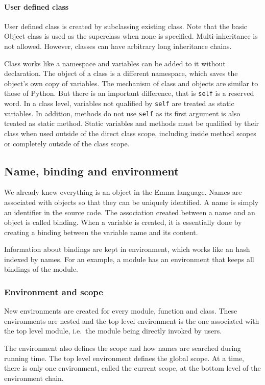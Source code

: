 \documentclass[10pt,a4paper]{article}
\begin{document}
\paragraph{User defined class}
User defined class is created by subclassing existing class. 
Note that the basic Object class is used as the superclass when none is 
specified. 
Multi-inheritance is not allowed.
However, classes can have arbitrary long inheritance chains.

Class works like a namespace and variables can be added to it without
declaration. 
The object of a class is a different namespace, which saves the object's
own copy of variables.
The mechanism of class and objects are similar to those of Python.
But there is an important difference, that is \lstinline$self$ is a 
reserved word.
In a class level, variables not qualified by \lstinline$self$ are treated
as static variables. In addition, methods do not use \lstinline$self$
as its first argument is also treated as static method.
Static variables and methods must be qualified by their class when used
outside of the direct class scope, including inside method scopes or 
completely outside of the class scope.

\subsection{Name, binding and environment}
We already knew everything is an object in the Emma language. 
Names are associated with objects so that they can be uniquely identified.
A name is simply an identifier in the source code. 
The association created between a name and an object is called binding.
When a variable is created, it is essentially done by
creating a binding between the variable name and its content.

Information about bindings are kept in environment, which works
like an hash indexed by names.
For an example, a module has an environment that keeps all bindings of 
the module.

\subsubsection{Environment and scope}
New environments are created for every module, function and class.
These environments are nested and the top level environment is the one
associated with the top level module, i.e.\ the module being directly
invoked by users. 

The environment also defines the scope and how names are searched during
running time. 
The top level environment defines the global scope. 
At a time, there is only one environment, called the current scope,
at the bottom level of the environment chain.
\end{document}

